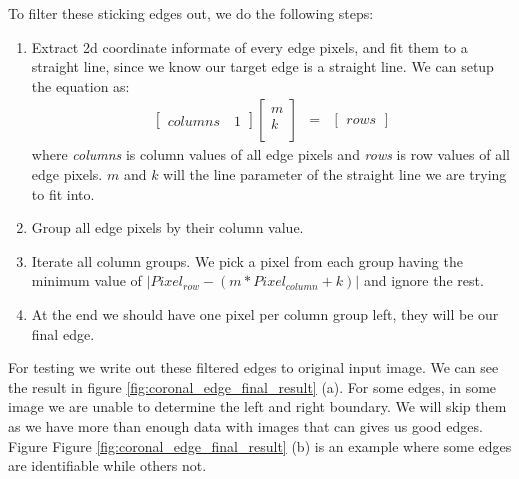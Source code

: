To filter these sticking edges out, we do the following steps:

\begin{enumerate}
  \item Extract 2d coordinate informate of every edge pixels, and fit them to a straight line, since we know
    our target edge is a straight line. We can setup the equation as:
    \begin{eqnarray}
      \begin{bmatrix}
        columns \quad 1
      \end{bmatrix}
      \begin{bmatrix}
        m\\
        k\\
      \end{bmatrix}
      & = & 
      \begin{bmatrix}
        rows
      \end{bmatrix}
    \end{eqnarray}
    where \emph{columns} is column values of all edge pixels and \emph{rows} is row values of all edge pixels.
    $m$ and $k$ will the line parameter of the straight line we are trying to fit into.
  \item Group all edge pixels by their column value.
  \item Iterate all column groups. We pick a pixel from each group having the minimum value of
    $|Pixel_{row} - (m*Pixel_{column} + k)|$ and ignore the rest.
  \item At the end we should have one pixel per column group left, they will be our final edge.
\end{enumerate}

For testing we write out these filtered edges to original input image. We can see the result in figure 
\ref{fig:coronal_edge_final_result} (a). For some edges, in some image we are unable to determine the left
and right boundary. We will skip them as we have more than enough data with images that can gives us good 
edges. Figure Figure \ref{fig:coronal_edge_final_result} (b) is an example where some edges are identifiable
while others not.

